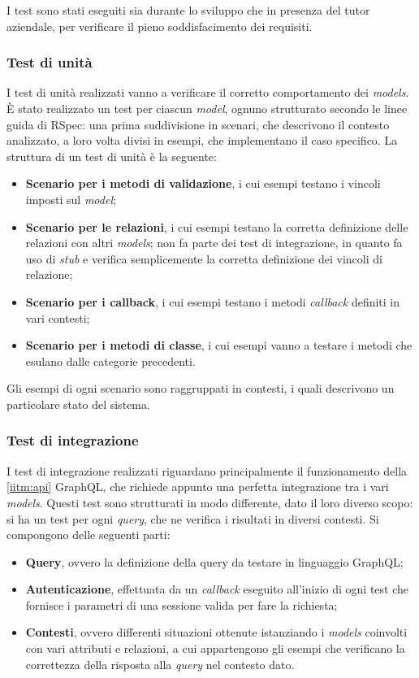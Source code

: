 I test sono stati eseguiti sia durante lo sviluppo che in presenza del tutor aziendale, per verificare il pieno soddisfacimento dei requisiti.
\subsubsection{Test di unità}
I test di unità realizzati vanno a verificare il corretto comportamento dei \textit{models}. È stato realizzato un test per ciascun \textit{model}, ognuno strutturato secondo le linee guida di RSpec: una prima suddivisione in scenari, che descrivono il contesto analizzato, a loro volta divisi in esempi, che implementano il caso specifico. La struttura di un test di unità è la seguente:
\begin{itemize}
    \item \textbf{Scenario per i metodi di validazione}, i cui esempi testano i vincoli imposti sul \textit{model};
    \item \textbf{Scenario per le relazioni}, i cui esempi testano la corretta definizione delle relazioni con altri \textit{models}; non fa parte dei test di integrazione, in quanto fa uso di \textit{stub} e verifica semplicemente la corretta definizione dei vincoli di relazione;
    \item \textbf{Scenario per i callback}, i cui esempi testano i metodi \textit{callback} definiti in vari contesti;
    \item \textbf{Scenario per i metodi di classe}, i cui esempi vanno a testare i metodi che esulano dalle categorie precedenti.
\end{itemize}

Gli esempi di ogni scenario sono raggruppati in contesti, i quali descrivono un particolare stato del sistema.
\subsubsection{Test di integrazione}
I test di integrazione realizzati riguardano principalmente il funzionamento della \ref{iitm:api} GraphQL, che richiede appunto una perfetta integrazione tra i vari \textit{models}. Questi test sono strutturati in modo differente, dato il loro diverso scopo: si ha un test per ogni \textit{query}, che ne verifica i risultati in diversi contesti. Si compongono delle seguenti parti:
\begin{itemize}
    \item \textbf{Query}, ovvero la definizione della query da testare in linguaggio GraphQL;
    \item \textbf{Autenticazione}, effettuata da un \textit{callback} eseguito all'inizio di ogni test che fornisce i parametri di una sessione valida per fare la richiesta;
    \item \textbf{Contesti}, ovvero differenti situazioni ottenute istanziando i \textit{models} coinvolti con vari attributi e relazioni, a cui appartengono gli esempi che verificano la correttezza della risposta alla \textit{query} nel contesto dato.
\end{itemize}

